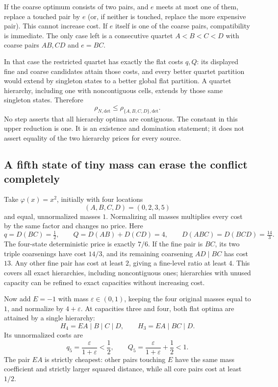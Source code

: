 If the coarse optimum consists of two pairs, and $e$ meets at most one of
them, replace a touched pair by $e$ (or, if neither is touched, replace the
more expensive pair).  This cannot increase cost.  If $e$ itself is one of
the coarse pairs, compatibility is immediate.  The only case left is a
consecutive quartet $A<B<C<D$ with coarse pairs $AB,CD$ and $e=BC$.

In that case the restricted quartet has exactly the flat costs $q,Q$:
its displayed fine and coarse candidates attain those costs, and every
better quartet partition would extend by singleton states to a better
global flat partition.  A quartet hierarchy, including one with
noncontiguous cells, extends by those same singleton states.  Therefore
\[
 \rho_{N,\mathrm{det}}\le \rho_{\{A,B,C,D\},\mathrm{det}}.
\]
No step asserts that all hierarchy optima are contiguous.  The constant in
this upper reduction is one.  It is an existence and domination statement;
it does not assert equality of the two hierarchy prices for every source.

\subsection{A fifth state of tiny mass can erase the conflict completely}
Take $\varphi(x)=x^2$, initially with four locations
\[
 (A,B,C,D)=(0,2,3,5)
\]
and equal, unnormalized masses $1$.  Normalizing all masses multiplies
every cost by the same factor and changes no price.  Here
\[
 q=D(BC)=\tfrac12,\qquad
 Q=D(AB)+D(CD)=4,\qquad
 D(ABC)=D(BCD)=\tfrac{14}{3}.
\]
The four-state deterministic price is exactly $7/6$.  If the fine pair is
$BC$, its two triple coarsenings have cost $14/3$, and its remaining
coarsening $AD\mid BC$ has cost $13$.  Any other fine pair has cost at
least $2$, giving a fine-level ratio at least $4$.  This covers all exact
hierarchies, including noncontiguous ones; hierarchies with unused capacity
can be refined to exact capacities without increasing cost.

Now add $E=-1$ with mass $\varepsilon\in(0,1)$, keeping the four original
masses equal to $1$, and normalize by $4+\varepsilon$.  At capacities three
and four, both flat optima are attained by a single hierarchy:
\[
 H_4=EA\mid B\mid C\mid D,
 \qquad H_3=EA\mid BC\mid D.
\]
Its unnormalized costs are
\[
 q_5=\frac{\varepsilon}{1+\varepsilon}<\frac12,
 \qquad
 Q_5=\frac{\varepsilon}{1+\varepsilon}+\frac12<1.
\]
The pair $EA$ is strictly cheapest: other pairs touching $E$ have the same
mass coefficient and strictly larger squared distance, while all core
pairs cost at least $1/2$.


